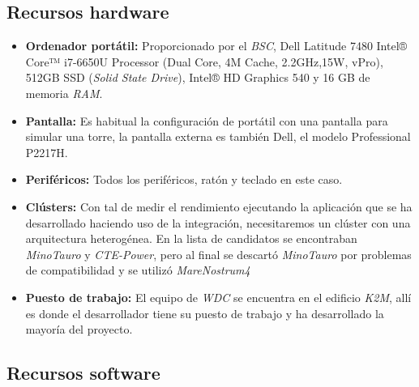 \subsection{Recursos hardware}

\begin{itemize}

 \item \textbf{Ordenador portátil:} Proporcionado por el \textit{BSC}, Dell Latitude 7480 Intel® Core™ i7-6650U Processor (Dual Core, 4M Cache, 2.2GHz,15W, vPro), 512GB SSD (\textit{Solid State Drive}), Intel® HD Graphics 540 y 16 GB de memoria \textit{RAM}.
 
 \item \textbf{Pantalla:} Es habitual la configuración de portátil con una pantalla para simular una torre, la pantalla externa es también Dell, el modelo Professional P2217H.
 
 \item \textbf{Periféricos:} Todos los periféricos, ratón y teclado en este caso.
 
 \item \textbf{Clústers:} Con tal de medir el rendimiento ejecutando la aplicación que se ha desarrollado haciendo uso de la integración, necesitaremos un clúster con una arquitectura heterogénea. En la lista de candidatos se encontraban \textit{MinoTauro} y \textit{CTE-Power}, pero al final se descartó \textit{MinoTauro} por problemas de compatibilidad y se utilizó \textit{MareNostrum4}
 
 \item \textbf{Puesto de trabajo:} El equipo de \textit{WDC} se encuentra en el edificio \textit{K2M}, allí es donde el desarrollador tiene su puesto de trabajo y ha desarrollado la mayoría del proyecto.
 
\end{itemize}

\subsection{Recursos software}

